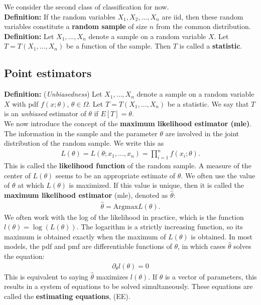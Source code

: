 \documentclass{book}
\theoremstyle{definition}
\newcommand{\p}{\partial}
\begin{document}
We consider the second class of classification for now.\\

\noindent \textbf{Definition:} If the random variables $X_1, X_2, \dots, X_n$ are iid, then these random variables constitute a \textbf{random sample} of size $n$ from the common distribution. \\


\noindent\textbf{Definition:} Let $X_1, \dots, X_n$ denote a sample on a random variable $X$. Let $T = T(X_1,\dots,X_n)$ be a function of the sample. Then $T$ is called a \textbf{statistic}. 





\subsection{Point estimators}

\noindent \textbf{Definition:} (\textit{Unbiasedness}) Let $X_1,\dots,X_n$ denote a sample on a random variable $X$ with pdf $f(x;\theta)$, $\theta\in \Omega$. Let $T = T(X_1,\dots,X_n)$ be a statistic. We say that $T$ is an \textit{unbiased} estimator of $\theta$ if $E[T] = \theta$.  \\

We now introduce the concept of the \textbf{maximum likelihood estimator (mle)}. The information in the sample and the parameter $\theta$ are involved in the joint distribution of the random sample. We write this as
\begin{align}
\boxed{L(\theta) = L(\theta; x_1,\dots,x_n) = \prod^n_{i=1}f(x_i;\theta).}
\end{align}
This is called the \textbf{likelihood function} of the random sample. A measure of the center of $L(\theta)$ seems to be an appropriate estimate of $\theta$. We often use the value of $\theta$ at which $L(\theta)$ is maximized. If this value is unique, then it is called the \textbf{maximum likelihood estimator} (mle), denoted as $\hat{\theta}$:
\begin{align}
\hat{\theta} = \text{Argmax}L(\theta).
\end{align}
We often work with the log of the likelihood in practice, which is the function $l(\theta) = \log(L(\theta))$. The logarithm is a strictly increasing function, so its maximum is obtained exactly when the maximum of $L(\theta)$ is obtained. In most models, the pdf and pmf are differentiable functions of $\theta$, in which cases $\hat{\theta}$ solves the equation:
\begin{align}
\boxed{\p_\theta l(\theta) = 0 }
\end{align}
This is equivalent to saying $\hat{\theta}$ maximizes $l(\theta)$. If $\theta$ is a vector of parameters, this results in a system of equations to be solved simultaneously. These equations are called the \textbf{estimating equations}, (EE).
\end{document}
